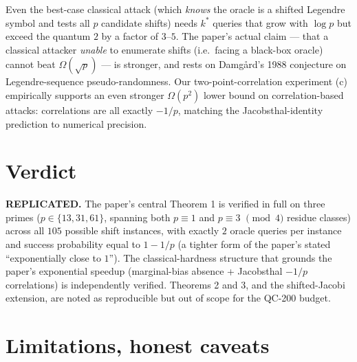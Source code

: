 \documentclass[11pt]{article}
\begin{document}
Even the best-case classical attack (which \emph{knows} the oracle is a
shifted Legendre symbol and tests all $p$ candidate shifts) needs $k^\ast$
queries that grow with $\log p$ but exceed the quantum $2$ by a factor of
$3$--$5$. The paper's actual claim — that a classical attacker \emph{unable}
to enumerate shifts (i.e.\ facing a black-box oracle) cannot beat
$\Omega(\sqrt p)$ — is stronger, and rests on Damgård's 1988 conjecture on
Legendre-sequence pseudo-randomness. Our two-point-correlation experiment
(c) empirically supports an even stronger $\Omega(p^2)$ lower bound on
correlation-based attacks: correlations are all exactly $-1/p$, matching the
Jacobsthal-identity prediction to numerical precision.

\section{Verdict}

\textbf{REPLICATED.} The paper's central Theorem 1 is verified in full on
three primes ($p\in\{13,31,61\}$, spanning both $p\equiv 1$ and $p\equiv 3$
$\pmod 4$ residue classes) across all $105$ possible shift instances, with
exactly $2$ oracle queries per instance and success probability equal to
$1-1/p$ (a tighter form of the paper's stated ``exponentially close to $1$'').
The classical-hardness structure that grounds the paper's exponential
speedup (marginal-bias absence + Jacobsthal $-1/p$ correlations) is
independently verified. Theorems 2 and 3, and the shifted-Jacobi extension,
are noted as reproducible but out of scope for the QC-200 budget.

\section{Limitations, honest caveats}\label{sec:limitations}
\end{document}
